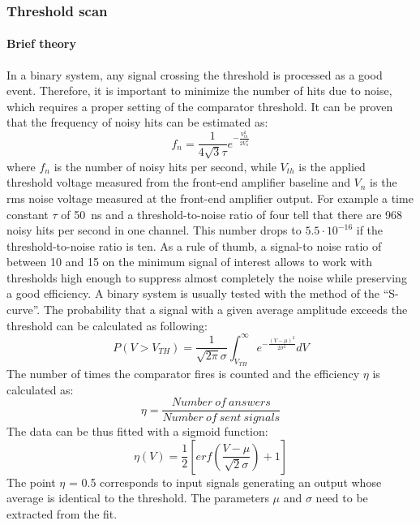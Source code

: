 \subsubsection{Threshold scan}\label{considerations}
\paragraph{Brief theory}
\noindent In a binary system, any signal crossing the threshold is processed as a good event\cite{rivetti}.
Therefore, it is important to minimize the number of hits due to noise, which requires a proper setting of the comparator threshold. It can be proven that the frequency of noisy hits can be estimated as:
\begin{equation}
	f_n=\frac{1}{4 \sqrt{3} \tau} e^{- \frac{V^2_{th}}{2V^2_n}} 
\end{equation}
\noindent where $f_n$ is the number of noisy hits per second, while $V_{th}$ is the applied threshold voltage measured from the front-end amplifier baseline and $V_{n}$ is the rms noise voltage measured at the front-end amplifier output.
For example a time constant $\tau$ of 50~ns and a threshold-to-noise
ratio of four tell that there are 968 noisy hits per second in one channel.
This number drops to $5.5\cdot10^{-16}$ if the threshold-to-noise ratio is ten.
As a rule of thumb, a signal-to noise ratio of between 10 and 15 on the minimum signal of interest allows to work with thresholds high enough to suppress almost completely the noise while preserving a good efficiency.
A binary system is usually tested with the method of the “S-curve”.
\newline
The probability that a signal with a given average amplitude exceeds
the threshold can be calculated as following:
\begin{equation}
	P(V>V_{TH}) = \frac{1}{\sqrt{2\pi}\sigma} \int_{V_{TH}}^{\infty} e^{- \frac{(V-\mu)^2}{2\sigma^2}} dV
\end{equation}
The number of times the comparator fires is counted and the efficiency $\eta$
is calculated as:
\begin{equation}
	\eta = \frac{Number \: of \: answers}{Number \: of \: sent \: signals}
\end{equation}
The data can be thus fitted with a sigmoid function:
\begin{equation}\label{erf}
	\eta (V) = \frac{1}{2} [erf(\frac{V-\mu}{\sqrt{2}\sigma})+1]
\end{equation}
The point $\eta$ = 0.5 corresponds to input signals generating an output whose average is identical to the threshold. The parameters $\mu$ and $\sigma$ need to be extracted from the fit.
